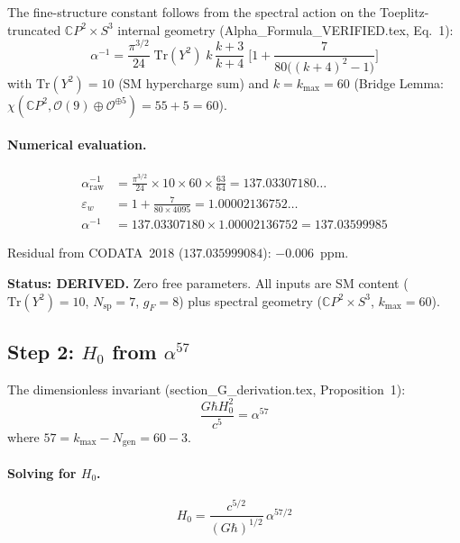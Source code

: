 \documentclass[12pt,a4paper]{article}
\newcommand{\CP}{\mathbb{C}P}
\newcommand{\Hzero}{H_0}
\begin{document}
The fine-structure constant follows from the spectral action on the
Toeplitz-truncated $\CP^2 \times S^3$ internal geometry
(Alpha\_Formula\_VERIFIED.tex, Eq.~1):
\begin{equation}
\boxed{
\alpha^{-1}
= \frac{\pi^{3/2}}{24}\;\mathrm{Tr}(Y^2)\;
k\,\frac{k+3}{k+4}\;
\biggl[1 + \frac{7}{80\bigl((k+4)^2-1\bigr)}\biggr]
}
\label{eq:oneliner}
\end{equation}
with $\mathrm{Tr}(Y^2) = 10$ (SM hypercharge sum) and $k = k_{\max} = 60$
(Bridge Lemma: $\chi(\CP^2, \mathcal{O}(9) \oplus \mathcal{O}^{\oplus 5})
= 55 + 5 = 60$).

\paragraph{Numerical evaluation.}
\begin{align}
\alpha^{-1}_{\mathrm{raw}}
&= \frac{\pi^{3/2}}{24} \times 10 \times 60 \times \frac{63}{64}
= 137.03307180\ldots \\
\varepsilon_w &= 1 + \frac{7}{80 \times 4095} = 1.00002136752\ldots \\
\alpha^{-1} &= 137.03307180 \times 1.00002136752 = 137.03599985
\end{align}

Residual from CODATA~2018 ($137.035999084$): $-0.006$~ppm.

\textbf{Status: DERIVED.} Zero free parameters.
All inputs are SM content ($\mathrm{Tr}(Y^2) = 10$, $N_{\mathrm{sp}} = 7$,
$g_F = 8$) plus spectral geometry ($\CP^2 \times S^3$,
$k_{\max} = 60$).

\subsection{Step 2: $\Hzero$ from $\alpha^{57}$}

The dimensionless invariant (section\_G\_derivation.tex, Proposition~1):
\begin{equation}
\boxed{\frac{G\hbar\Hzero^2}{c^5} = \alpha^{57}}
\label{eq:alpha57}
\end{equation}
where $57 = k_{\max} - N_{\mathrm{gen}} = 60 - 3$.

\paragraph{Solving for $\Hzero$.}
\begin{equation}
\Hzero = \frac{c^{5/2}}{(G\hbar)^{1/2}}\,\alpha^{57/2}
\end{equation}
\end{document}
